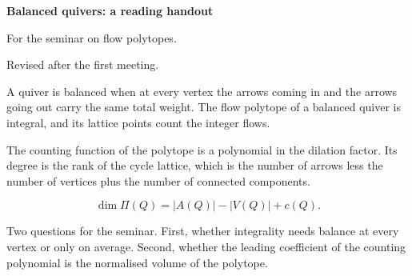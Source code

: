 \documentclass[11pt]{article}
\begin{document}
\noindent\textbf{Balanced quivers: a reading handout}

\medskip
\noindent For the seminar on flow polytopes.

\noindent Revised after the first meeting.

\bigskip
A quiver is balanced when at every vertex the arrows coming in and the arrows going out carry the same total weight. The flow polytope of a balanced quiver is integral, and its lattice points count the integer flows.

The counting function of the polytope is a polynomial in the dilation factor. Its degree is the rank of the cycle lattice, which is the number of arrows less the number of vertices plus the number of connected components.

\begin{equation*}
  \dim \Pi(Q) = |A(Q)| - |V(Q)| + c(Q).
\end{equation*}

Two questions for the seminar. First, whether integrality needs balance at every vertex or only on average. Second, whether the leading coefficient of the counting polynomial is the normalised volume of the polytope.
\end{document}
